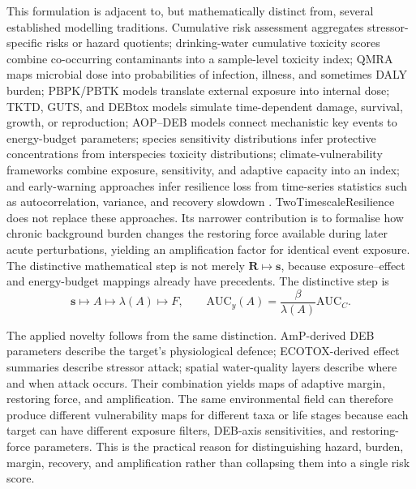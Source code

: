 	This formulation is adjacent to, but mathematically distinct from, several established modelling traditions. Cumulative risk assessment aggregates stressor-specific risks or hazard quotients; drinking-water cumulative toxicity scores combine co-occurring contaminants into a sample-level toxicity index; QMRA maps microbial dose into probabilities of infection, illness, and sometimes DALY burden; PBPK/PBTK models translate external exposure into internal dose; TKTD, GUTS, and DEBtox models simulate time-dependent damage, survival, growth, or reproduction; AOP--DEB models connect mechanistic key events to energy-budget parameters; species sensitivity distributions infer protective concentrations from interspecies toxicity distributions; climate-vulnerability frameworks combine exposure, sensitivity, and adaptive capacity into an index; and early-warning approaches infer resilience loss from time-series statistics such as autocorrelation, variance, and recovery slowdown \citep{sexton2012cumulative,stoiber2019drinking,who2016qmra,huang2024pbpk,efsa2018tktd,murphy2018aopdeb,fox2021ssd,hyman2024ccva,dakos2024tipping}. TwoTimescaleResilience does not replace these approaches. Its narrower contribution is to formalise how chronic background burden changes the restoring force available during later acute perturbations, yielding an amplification factor for identical event exposure. The distinctive mathematical step is not merely $\mathbf{R}\mapsto\mathbf{s}$, because exposure--effect and energy-budget mappings already have precedents. The distinctive step is
	\begin{equation}
		\mathbf{s}\mapsto A\mapsto\lambda(A)\mapsto F,
		\qquad
		\mathrm{AUC}_y(A)=\frac{\beta}{\lambda(A)}\mathrm{AUC}_C.
	\end{equation}
	
	The applied novelty follows from the same distinction. AmP-derived DEB parameters describe the target's physiological defence; ECOTOX-derived effect summaries describe stressor attack; spatial water-quality layers describe where and when attack occurs. Their combination yields maps of adaptive margin, restoring force, and amplification. The same environmental field can therefore produce different vulnerability maps for different taxa or life stages because each target can have different exposure filters, DEB-axis sensitivities, and restoring-force parameters. This is the practical reason for distinguishing hazard, burden, margin, recovery, and amplification rather than collapsing them into a single risk score.
	
